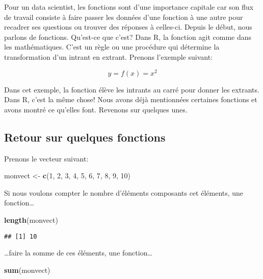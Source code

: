 \documentclass[]{book}
\newenvironment{Shaded}{\begin{snugshade}}{\end{snugshade}}
\newcommand{\KeywordTok}[1]{\textcolor[rgb]{0.13,0.29,0.53}{\textbf{#1}}}
\newcommand{\DecValTok}[1]{\textcolor[rgb]{0.00,0.00,0.81}{#1}}
\newcommand{\StringTok}[1]{\textcolor[rgb]{0.31,0.60,0.02}{#1}}
\newcommand{\NormalTok}[1]{#1}
\begin{document}
Pour un data scientist, les fonctions sont d'une importance capitale car
son flux de travail consiste à faire passer les données d'une fonction à
une autre pour recadrer ses questions ou trouver des réponses à
celles-ci. Depuis le début, nous parlons de fonctions. Qu'est-ce que
c'est? Dans R, la fonction agit comme dans les mathématiques. C'est un
règle ou une procédure qui détermine la transformation d'un intrant en
extrant. Prenons l'exemple suivant:

\[y = f(x) = x^2\]

Dans cet exemple, la fonction élève les intrants au carré pour donner
les extrants. Dans R, c'est la même chose! Nous avons déjà mentionnées
certaines fonctions et avons montré ce qu'elles font. Revenons sur
quelques unes.

\subsection{Retour sur quelques
fonctions}\label{retour-sur-quelques-fonctions}

Prenons le vecteur suivant:

\begin{Shaded}
\begin{Highlighting}[]
\NormalTok{monvect <-}\StringTok{ }\KeywordTok{c}\NormalTok{(}\DecValTok{1}\NormalTok{, }\DecValTok{2}\NormalTok{, }\DecValTok{3}\NormalTok{, }\DecValTok{4}\NormalTok{, }\DecValTok{5}\NormalTok{, }\DecValTok{6}\NormalTok{, }\DecValTok{7}\NormalTok{, }\DecValTok{8}\NormalTok{, }\DecValTok{9}\NormalTok{, }\DecValTok{10}\NormalTok{)}
\end{Highlighting}
\end{Shaded}

Si nous voulons compter le nombre d'éléments composants cet éléments,
une fonction\ldots{}

\begin{Shaded}
\begin{Highlighting}[]
\KeywordTok{length}\NormalTok{(monvect)}
\end{Highlighting}
\end{Shaded}

\begin{verbatim}
## [1] 10
\end{verbatim}

\ldots{}faire la somme de ces éléments, une fonction\ldots{}

\begin{Shaded}
\begin{Highlighting}[]
\KeywordTok{sum}\NormalTok{(monvect)}
\end{Highlighting}
\end{Shaded}
\end{document}

